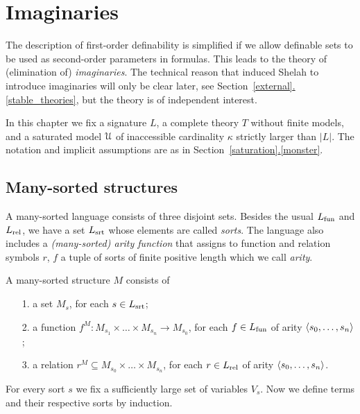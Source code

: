 \documentclass[creche.tex]{subfiles}
\begin{document}
\chapter{Imaginaries}
\label{imaginary}

\def\medrel#1{\parbox[t]{6ex}{$\displaystyle\hfil #1$}}
\def\ceq#1#2#3{\parbox[t]{25ex}{$\displaystyle #1$}\medrel{#2}{$\displaystyle #3$}}


\def\vl{\mr}

The description of first-order definability is simplified if we allow definable sets to be used as second-order parameters in formulas.
This leads to the theory of (elimination of) \textit{imaginaries}.
The technical reason that induced Shelah to introduce imaginaries will only be clear later, see Section~\hyperref[stable_theories]{\ref*{external}.\ref*{stable_theories}}, but the theory is of independent interest.

In this chapter we fix a signature $L$, a complete theory $T$ without finite models, and a saturated model $\EuScript U$ of inaccessible cardinality $\kappa$ strictly larger than $|L|$.
The notation and implicit assumptions are as in Section~\hyperref[monster]{\ref*{saturation}.\ref*{monster}}.

\section{Many-sorted structures}
\label{many-sorted}
\def\Ar{{\rm Ar}}

A many-sorted language consists of three disjoint sets.
Besides the usual $L_{\rm fun}$ and $L_{\rm rel}$, we have a set $L_{\rm srt}$  whose elements are called \emph{sorts}.
The language also includes a \emph{(many-sorted) arity function} that assigns to function and relation symbols $r$, $f$ a tuple of sorts of finite positive length which we call \emph{arity}.

A many-sorted structure $M$ consists of
\begin{itemize}
\item[1.] a set $M_s$, for each $s\in L_{\rm srt}$;
\item[2.] a function $f^M:M_{s_1}\times\dots\times M_{s_n}\to M_{s_0}$, for each $f\in L_{\rm fun}$ of arity $\langle s_0,\dots,s_n\rangle$;
\item[3.] a relation $r^M\subseteq M_{s_0}\times\dots\times M_{s_n}$, for each $r\in L_{\rm rel}$ of arity $\langle s_0,\dots,s_n\rangle$.
\end{itemize}

For every sort $s$ we fix a sufficiently large set of variables $V_s$.
Now we define terms and their respective sorts by induction.
\end{document}
